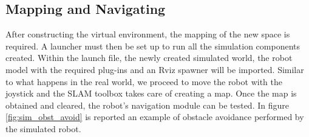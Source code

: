 \subsection{Mapping and Navigating}
After constructing the virtual environment, the mapping of the new space is required. A launcher must then be set up to run all the simulation components created. Within the launch file, the newly created simulated world, the robot model with the required plug-ins and an Rviz spawner will be imported. Similar to what happens in the real world, we proceed to move the robot with the joystick and the SLAM toolbox takes care of creating a map. 
Once the map is obtained and cleared, the robot's navigation module can be tested. 
In figure \ref{fig:sim_obst_avoid} is reported an example of obstacle avoidance performed by the simulated robot. 

